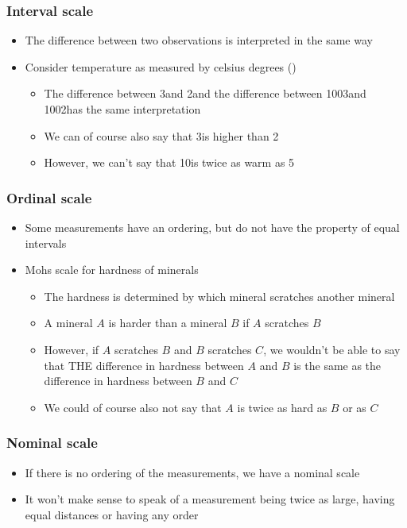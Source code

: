 \documentclass[compress]{beamer}\usepackage[]{graphicx}\usepackage[]{xcolor}
\begin{document}
\begin{frame}[fragile]
  \frametitle{Interval scale}
    \begin{itemize}
      \item The difference between two observations is interpreted in the same way
      \item Consider temperature as measured by celsius degrees (\textcelsius)
        \begin{itemize}
          \item The difference between 3\C and 2\C and the difference between 1003\C and 1002\C has the same interpretation
          \item We can of course also say that 3\C is higher than 2\C
          \item However, we can't say that 10\C is twice as warm as 5\C
        \end{itemize}
    \end{itemize}
\end{frame}


\begin{frame}[fragile]
  \frametitle{Ordinal scale}
    \begin{itemize}
      \item Some measurements have an ordering, but do not have the property of equal intervals
      \item Mohs scale for hardness of minerals
        \begin{itemize}
          \item The hardness is determined by which mineral scratches another mineral
          \item A mineral $A$ is harder than a mineral $B$ if $A$ scratches $B$
          \item However, if $A$ scratches $B$ and $B$ scratches $C$, we wouldn't be able to say that THE difference in hardness between $A$ and $B$ is the same as the difference in hardness between $B$ and $C$
          \item We could of course also not say that $A$ is twice as hard as $B$ or as $C$
        \end{itemize}
    \end{itemize}
\end{frame}


\begin{frame}[fragile]
  \frametitle{Nominal scale}
    \begin{itemize}
      \item If there is no ordering of the measurements, we have a nominal scale
      \item It won't make sense to speak of a measurement being twice as large, having equal distances or having any order
    \end{itemize}
\end{frame}
\end{document}
